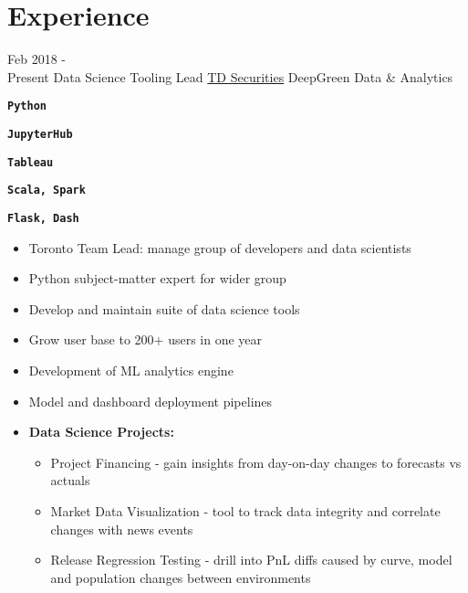 \documentclass[letterpaper]{twentysecondcv} %
\begin{document}
\makeprofile %

\newcommand{\skill}[1]{\texttt{\textbf{#1}}}


\section{Experience}

\begin{twenty} %

	\twentyitem
		{Feb 2018 - \\ Present}
		{Data Science Tooling Lead}
		{\href{https://www.tdsecurities.com}{TD Securities}}
		{DeepGreen Data \& Analytics}
		{\item\skill{Python}
		\item
		\item\skill{JupyterHub}
		\item\skill{Tableau}
		\item
		\item\skill{Scala, Spark}
		\item\skill{Flask, Dash}
		}
		{
			\begin{itemize}
				\item Toronto Team Lead: manage group of developers and data scientists
				\item Python subject-matter expert for wider group
				\item Develop and maintain suite of data science tools
				\item Grow user base to 200+ users in one year
				\item Development of ML analytics engine
				\item Model and dashboard deployment pipelines
				\item \textbf{Data Science Projects:}
				\begin{itemize}
					\item Project Financing - gain insights from day-on-day changes to forecasts vs actuals
					\item Market Data Visualization - tool to track data integrity and correlate changes with news events
					\item Release Regression Testing - drill into PnL diffs caused by curve, model and population changes between environments

\end{itemize}
\end{itemize}}
\end{twenty}
\end{document}

